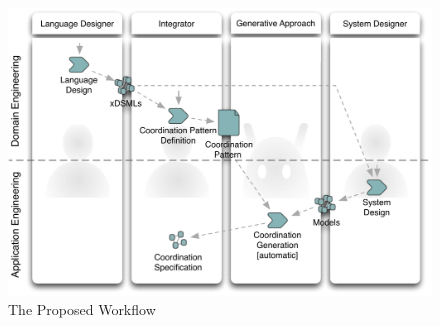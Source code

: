 \begin{figure}
	\begin{center}
		\includegraphics[width=.6\textwidth]{bcool/figs/process}
		\caption{The Proposed Workflow}
		\label{fig:proposedworkflow}
	\end{center}
\end{figure}

